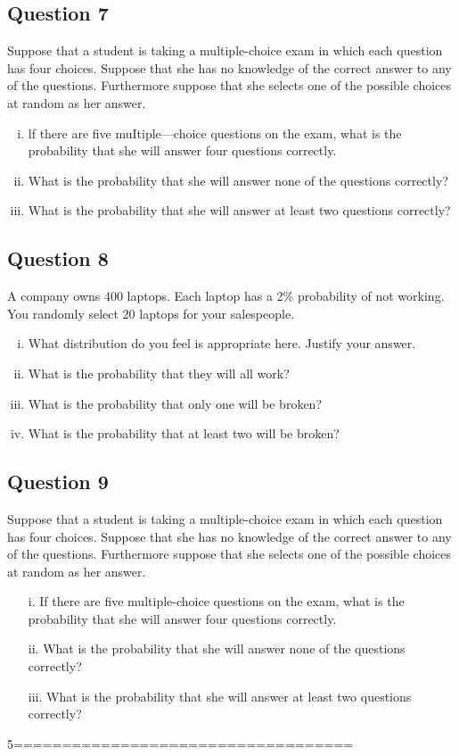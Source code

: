 \documentclass[]{report}
\begin{document}
\subsection*{Question 7}
Suppose that a student is taking a multiple-choice exam in which each question has four choices.
Suppose that she has no knowledge of the correct answer to any of the questions. Furthermore suppose that she selects one of the possible choices at random as her answer.
\begin{enumerate}[(i)]
\item lf there are five muItiple—choice questions on the exam, what is the probability that she will answer four questions correctly.
\item What is the probability that she will answer none of the questions correctly?
\item What is the probability that she will answer at least two questions correctly?
\end{enumerate}




\subsection*{Question 8}
A company owns 400 laptops. Each laptop has a 2\% probability of not working. You randomly select 20 laptops for your salespeople.
\begin{enumerate}[(i)]
\item What distribution do you feel is appropriate here. Justify your answer. 
\item What is the probability that they will all work?
\item What is the probability that only one will be broken?
\item What is the probability that at least two will be broken? 
\end{enumerate}


\subsection*{Question 9}
Suppose that a student is taking a multiple-choice exam in which each question has four choices.
Suppose that she has no knowledge of the correct answer to any of the questions. Furthermore suppose that she selects one of the possible choices at random as her answer.
\begin{itemize}
\item [i.] If there are five multiple-choice questions on the exam, what is the probability that she will answer four questions correctly.
\item [ii.] What is the probability that she will answer none of the questions correctly?
\item [iii.] What is the probability that she will answer at least two questions correctly?
\end{itemize}
5===================================%
\end{document}
